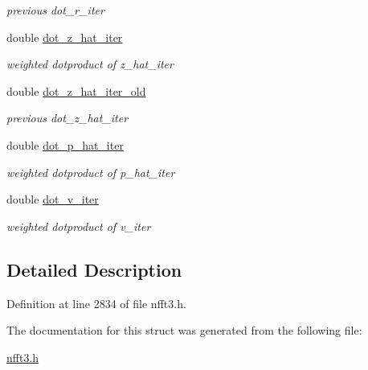 \begin{CompactItemize}
\begin{CompactList}\small\item\em previous dot\_\-r\_\-iter \item\end{CompactList}\item 
\hypertarget{structsolver__plan__double_495a0f084b43fea59c6328e085467cea}{
double \hyperlink{structsolver__plan__double_495a0f084b43fea59c6328e085467cea}{dot\_\-z\_\-hat\_\-iter}}
\label{structsolver__plan__double_495a0f084b43fea59c6328e085467cea}

\begin{CompactList}\small\item\em weighted dotproduct of z\_\-hat\_\-iter \item\end{CompactList}\item 
\hypertarget{structsolver__plan__double_35f2567cc25bcfce28dbb48eba5e49c9}{
double \hyperlink{structsolver__plan__double_35f2567cc25bcfce28dbb48eba5e49c9}{dot\_\-z\_\-hat\_\-iter\_\-old}}
\label{structsolver__plan__double_35f2567cc25bcfce28dbb48eba5e49c9}

\begin{CompactList}\small\item\em previous dot\_\-z\_\-hat\_\-iter \item\end{CompactList}\item 
\hypertarget{structsolver__plan__double_21f781633362300a145e71ea88febbae}{
double \hyperlink{structsolver__plan__double_21f781633362300a145e71ea88febbae}{dot\_\-p\_\-hat\_\-iter}}
\label{structsolver__plan__double_21f781633362300a145e71ea88febbae}

\begin{CompactList}\small\item\em weighted dotproduct of p\_\-hat\_\-iter \item\end{CompactList}\item 
\hypertarget{structsolver__plan__double_364a63cb093efa72e618a349a58d1890}{
double \hyperlink{structsolver__plan__double_364a63cb093efa72e618a349a58d1890}{dot\_\-v\_\-iter}}
\label{structsolver__plan__double_364a63cb093efa72e618a349a58d1890}

\begin{CompactList}\small\item\em weighted dotproduct of v\_\-iter \item\end{CompactList}\end{CompactItemize}


\subsection{Detailed Description}


Definition at line 2834 of file nfft3.h.

The documentation for this struct was generated from the following file:\begin{CompactItemize}
\item 
\hyperlink{nfft3_8h}{nfft3.h}\end{CompactItemize}
